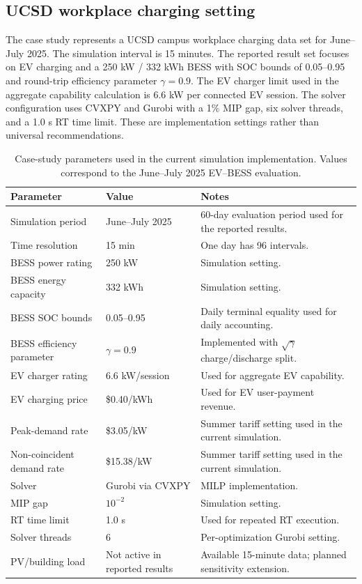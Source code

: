 \documentclass[final,5p,times]{elsarticle}
\begin{document}
\subsection{UCSD workplace charging setting}
The case study represents a UCSD campus workplace charging data set for June--July 2025. The simulation interval is 15 minutes. The reported result set focuses on EV charging and a 250 kW / 332 kWh BESS with SOC bounds of 0.05--0.95 and round-trip efficiency parameter $\gamma=0.9$. The EV charger limit used in the aggregate capability calculation is 6.6 kW per connected EV session. The solver configuration uses CVXPY and Gurobi with a 1\% MIP gap, six solver threads, and a 1.0 s RT time limit. These are implementation settings rather than universal recommendations.

\begin{table}[!t]
\centering
\caption{Case-study parameters used in the current simulation implementation. Values correspond to the June--July 2025 EV--BESS evaluation.}
\label{tab:case_parameters}
\scriptsize
\begin{tabularx}{\textwidth}{@{}p{}p{}X@{}}
\toprule
Parameter & Value & Notes \\
\midrule
Simulation period & June--July 2025 & 60-day evaluation period used for the reported results.\\
Time resolution & 15 min & One day has 96 intervals.\\
BESS power rating & 250 kW & Simulation setting.\\
BESS energy capacity & 332 kWh & Simulation setting.\\
BESS SOC bounds & 0.05--0.95 & Daily terminal equality used for daily accounting.\\
BESS efficiency parameter & $\gamma=0.9$ & Implemented with $\sqrt{\gamma}$ charge/discharge split.\\
EV charger rating & 6.6 kW/session & Used for aggregate EV capability.\\
EV charging price & \$0.40/kWh & Used for EV user-payment revenue.\\
Peak-demand rate & \$3.05/kW & Summer tariff setting used in the current simulation.\\
Non-coincident demand rate & \$15.38/kW & Summer tariff setting used in the current simulation.\\
Solver & Gurobi via CVXPY & MILP implementation.\\
MIP gap & $10^{-2}$ & Simulation setting.\\
RT time limit & 1.0 s & Used for repeated RT execution.\\
Solver threads & 6 & Per-optimization Gurobi setting.\\
PV/building load & Not active in reported results & Available 15-minute data; planned sensitivity extension.\\
\bottomrule
\end{tabularx}
\end{table}
\end{document}
